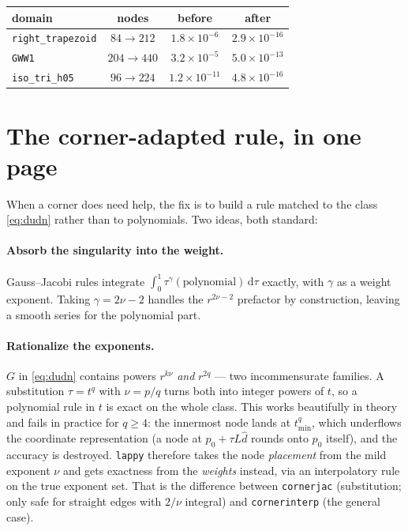 \documentclass[11pt]{article}
\theoremstyle{definition}
\theoremstyle{remark}
\newcommand{\dd}{\,\mathrm{d}}
\newcommand{\code}[1]{\texttt{#1}}
\begin{document}
\begin{center}
\begin{tabular}{lccc}
\toprule
domain & nodes & before & after\\
\midrule
\code{right\_trapezoid} & $84\to212$ & $1.8\times10^{-6}$ & $2.9\times10^{-16}$\\
\code{GWW1} & $204\to440$ & $3.2\times10^{-5}$ & $5.0\times10^{-13}$\\
\code{iso\_tri\_h05} & $96\to224$ & $1.2\times10^{-11}$ & $4.8\times10^{-16}$\\
\bottomrule
\end{tabular}
\end{center}

\section{The corner-adapted rule, in one page}

When a corner does need help, the fix is to build a rule matched to the class
\eqref{eq:dudn} rather than to polynomials. Two ideas, both standard:

\paragraph{Absorb the singularity into the weight.} Gauss--Jacobi rules integrate
$\int_0^1\tau^{\gamma}(\text{polynomial})\dd\tau$ exactly, with $\gamma$ as a
weight exponent. Taking $\gamma=2\nu-2$ handles the $r^{2\nu-2}$ prefactor by
construction, leaving a smooth series for the polynomial part.

\paragraph{Rationalize the exponents.} $G$ in \eqref{eq:dudn} contains powers
$r^{k\nu}$ \emph{and} $r^{2q}$ --- two incommensurate families. A substitution
$\tau=t^{q}$ with $\nu=p/q$ turns both into integer powers of $t$, so a
polynomial rule in $t$ is exact on the whole class. This works beautifully in
theory and fails in practice for $q\ge4$: the innermost node lands at
$t_{\min}^q$, which underflows the coordinate representation (a node at
$p_0+\tau L\hat d$ rounds onto $p_0$ itself), and the accuracy is destroyed.
\code{lappy} therefore takes the node \emph{placement} from the mild exponent
$\nu$ and gets exactness from the \emph{weights} instead, via an interpolatory
rule on the true exponent set. That is the difference between \code{cornerjac}
(substitution; only safe for straight edges with $2/\nu$ integral) and
\code{cornerinterp} (the general case).
\end{document}
